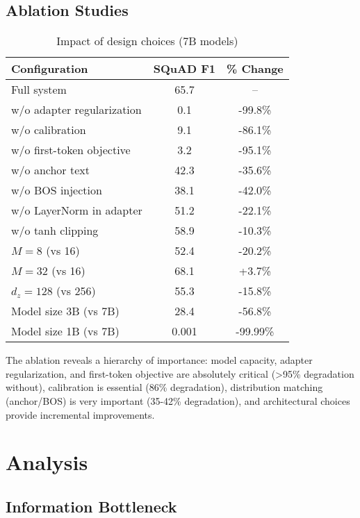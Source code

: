 \documentclass{article}
\begin{document}
\subsection{Ablation Studies}

\begin{table}[h]
\caption{Impact of design choices (7B models)}
\label{tab:ablation_extended}
\vskip 0.15in
\begin{center}
\begin{small}
\begin{tabular}{lcc}
\toprule
Configuration & SQuAD F1 & \% Change \\
\midrule
Full system & 65.7 & -- \\
\midrule
w/o adapter regularization & 0.1 & -99.8\% \\
w/o calibration & 9.1 & -86.1\% \\
w/o first-token objective & 3.2 & -95.1\% \\
w/o anchor text & 42.3 & -35.6\% \\
w/o BOS injection & 38.1 & -42.0\% \\
w/o LayerNorm in adapter & 51.2 & -22.1\% \\
w/o tanh clipping & 58.9 & -10.3\% \\
$M=8$ (vs 16) & 52.4 & -20.2\% \\
$M=32$ (vs 16) & 68.1 & +3.7\% \\
$d_z=128$ (vs 256) & 55.3 & -15.8\% \\
Model size 3B (vs 7B) & 28.4 & -56.8\% \\
Model size 1B (vs 7B) & 0.001 & -99.99\% \\
\bottomrule
\end{tabular}
\end{small}
\end{center}
\vskip -0.1in
\end{table}

The ablation reveals a hierarchy of importance: model capacity, adapter regularization, and first-token objective are absolutely critical (>95\% degradation without), calibration is essential (86\% degradation), distribution matching (anchor/BOS) is very important (35-42\% degradation), and architectural choices provide incremental improvements.

\section{Analysis}

\subsection{Information Bottleneck}
\end{document}
